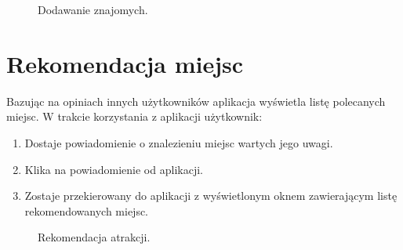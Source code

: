 \begin{figure}[h]

\null\hfill
{}
\hfill
{}
\hfill
{}
\hfill\null

\caption{Dodawanie znajomych.}
\label{fig:podrecznik9}
\end{figure}
\FloatBarrier


\section{Rekomendacja miejsc}
Bazując na opiniach innych użytkowników aplikacja wyświetla listę polecanych miejsc. W trakcie korzystania z aplikacji użytkownik:
\begin{enumerate}
\item Dostaje powiadomienie o znalezieniu miejsc wartych jego uwagi.
\item Klika na powiadomienie od aplikacji.
\item Zostaje przekierowany do aplikacji z wyświetlonym oknem zawierającym listę rekomendowanych miejsc.
\end{enumerate}
\begin{figure}[h]

\centering
\null\hfill
{}
\hfill
{}
\hfill\null

\caption{Rekomendacja atrakcji.}
\label{fig:podrecznik11}
\end{figure}
\FloatBarrier